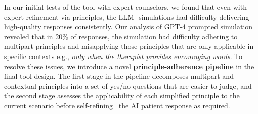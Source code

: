 \documentclass[11pt]{article}
\newcommand{\ryan}[1]{\ifthenelse{\boolean{showcomments}}{\textcolor{orange}{[#1 —ryan]}}{}}
\newcommand{\raj}[1]{\ifthenelse{\boolean{showcomments}}{\textcolor{purple}{[#1 —raj]}}{}}
\begin{document}

In our initial tests of the tool with expert-counselors, we found that even with expert refinement via principles, the LLM- simulations had difficulty delivering high-quality responses consistently.
Our analysis of GPT-4 prompted simulation revealed that in 20\% of responses, the simulation had difficulty adhering to multipart principles and misapplying those principles that are only applicable in specific contexts e.g., \textit{only when the therapist provides encouraging words}.
To resolve these issues, we introduce a novel \textbf{principle-adherence pipeline} in the final tool design. The first stage in the pipeline decomposes multipart and contextual principles into a set of yes/no questions that are easier to judge, and the second stage assesses the applicability of each simplified principle to the current scenario before self-refining~\cite{madaan2023selfrefine} the AI patient response as required.
\end{document}
